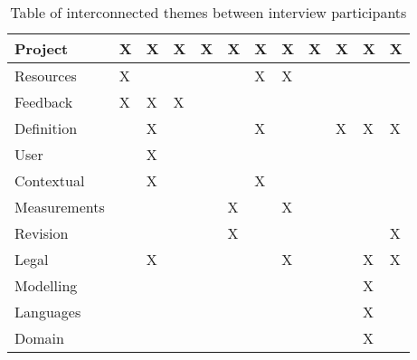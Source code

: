 \begin{table}[H]
{\begin{tabular}{|l|l|l|l|l|l|l|l|l|l|l|l|}
Project                         & X   & X   & X   & X   & X   & X   & X   & X   & X   & X    & X    \\ \hline
Resources                       & X   &     &     &     &     & X   & X   &     &     &      &      \\ \hline
Feedback                        & X   & X   & X   &     &     &     &     &     &     &      &      \\ \hline
Definition                      &     & X   &     &     &     & X   &     &     & X   & X    & X    \\ \hline
User                            &     & X   &     &     &     &     &     &     &     &      &      \\ \hline
Contextual                      &     & X   &     &     &     & X   &     &     &     &      &      \\ \hline
Measurements                    &     &     &     &     & X   &     & X   &     &     &      &      \\ \hline
Revision                        &     &     &     &     & X   &     &     &     &     &      & X    \\ \hline
Legal                           &     & X   &     &     &     &     & X   &     &     & X    & X    \\ \hline
Modelling                       &     &     &     &     &     &     &     &     &     & X    &      \\ \hline
Languages                       &     &     &     &     &     &     &     &     &     & X    &      \\ \hline
Domain                          &     &     &     &     &     &     &     &     &     & X    &      \\ \hline
\end{tabular}%
}
\caption{Table of interconnected themes between interview participants}
\label{tab:interconnected_themes}
\end{table}


